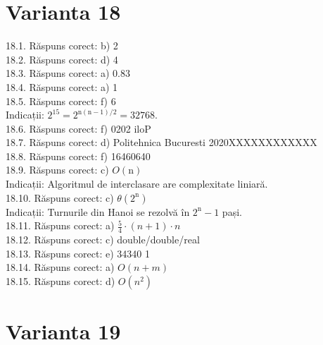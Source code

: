 \section*{Varianta 18}

18.1. Răspuns corect: b) 2\\

18.2. Răspuns corect: d) 4\\

18.3. Răspuns corect: a) 0.83\\

18.4. Răspuns corect: a) 1\\

18.5. Răspuns corect: f) 6\\
Indicații: $2^{15}=2^{\mathrm{n}(\mathrm{n}-1) / 2}=32768$.\\

18.6. Răspuns corect: f) 0202 iloP\\

18.7. Răspuns corect: d) Politehnica Bucuresti 2020XXXXXXXXXXXX\\

18.8. Răspuns corect: f) 16460640\\

18.9. Răspuns corect: c) $O(\mathrm{n})$\\
Indicații: Algoritmul de interclasare are complexitate liniară.\\

18.10. Răspuns corect: c) $\theta\left(2^{\mathrm{n}}\right)$\\
Indicații: Turnurile din Hanoi se rezolvă în $2^{\mathrm{n}}-1$ pași.\\

18.11. Răspuns corect: a) $\frac{5}{4} \cdot(n+1) \cdot n$\\

18.12. Răspuns corect: c) double/double/real\\

18.13. Răspuns corect: e) 34340 1\\

18.14. Răspuns corect: a) $O(n+m)$\\

18.15. Răspuns corect: d) $O\left(n^{2}\right)$\\

\section*{Varianta 19}

